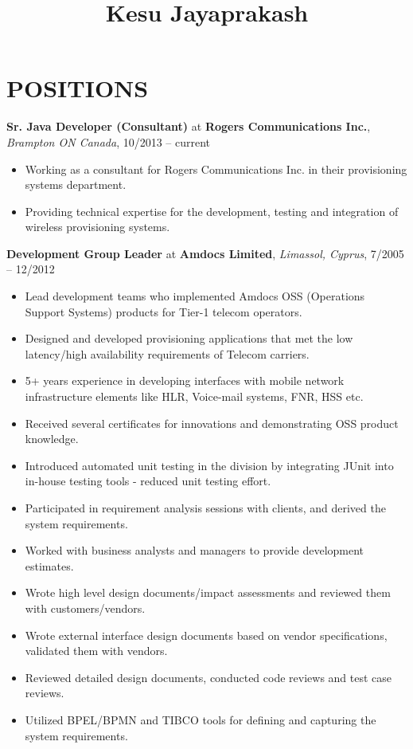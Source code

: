 \documentclass[10pt]{article}
\title{\bfseries\Huge Kesu Jayaprakash}
\author{}
\date{}
\begin{document}
\maketitle

\section*{POSITIONS}
\begin{cvitem}
\textbf{Sr. Java Developer (Consultant)} at \textbf{Rogers Communications Inc.}, \textit{Brampton ON Canada}, 10/2013 -- current\par
\begin{itemize}
	\item Working as a consultant for Rogers Communications Inc. in their provisioning systems department.
	\item Providing technical expertise for the development, testing and integration of wireless provisioning systems.
\end{itemize}
\end{cvitem}
\begin{cvitem}
\textbf{Development Group Leader} at \textbf{Amdocs Limited}, \textit{Limassol, Cyprus}, 7/2005 -- 12/2012\par
\begin{itemize}
	\item Lead development teams who implemented Amdocs OSS (Operations Support Systems) products for Tier-1 telecom operators.
	\item Designed and developed provisioning applications that met the low latency/high availability requirements of Telecom carriers.
	\item 5+ years experience in developing interfaces with mobile network infrastructure elements like HLR, Voice-mail systems, FNR, HSS etc.
	\item Received several certificates for innovations and demonstrating OSS product knowledge.
	\item Introduced automated unit testing in the division by integrating JUnit into in-house testing tools - reduced unit testing effort.
	\item Participated in requirement analysis sessions with clients, and derived the system requirements.
	\item Worked with business analysts and managers to provide development estimates.
	\item Wrote high level design documents/impact assessments and reviewed them with customers/vendors.
	\item Wrote external interface design documents based on vendor specifications, validated them with vendors.
	\item Reviewed detailed design documents, conducted code reviews and test case reviews.
	\item Utilized BPEL/BPMN and TIBCO tools for defining and capturing the system requirements.
\end{itemize}
\end{cvitem}
\end{document}
